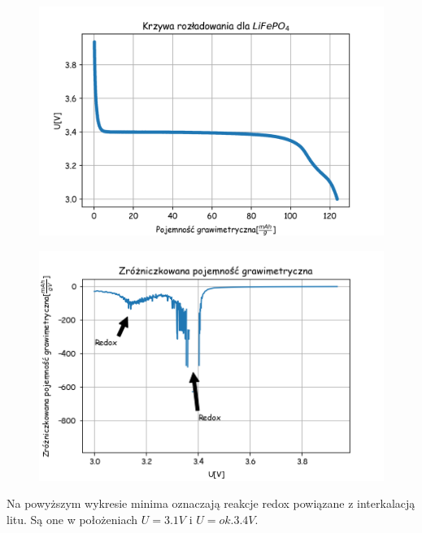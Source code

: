 \documentclass[a4paper,10pt]{article}
\begin{document}
 \begin{figure}[H]
	\centering
		\includegraphics[width=\textwidth]{../Krzywa_rozladowania.png}
\end{figure}

\begin{figure}[H]
	\centering
		\includegraphics[width=\textwidth]{../rozniczka.png}
\end{figure}
Na powyższym wykresie minima oznaczają reakcje redox powiązane z interkalacją litu. Są one w położeniach $U = 3.1V$ i $U = ok. 3.4V$.  
\end{document}
